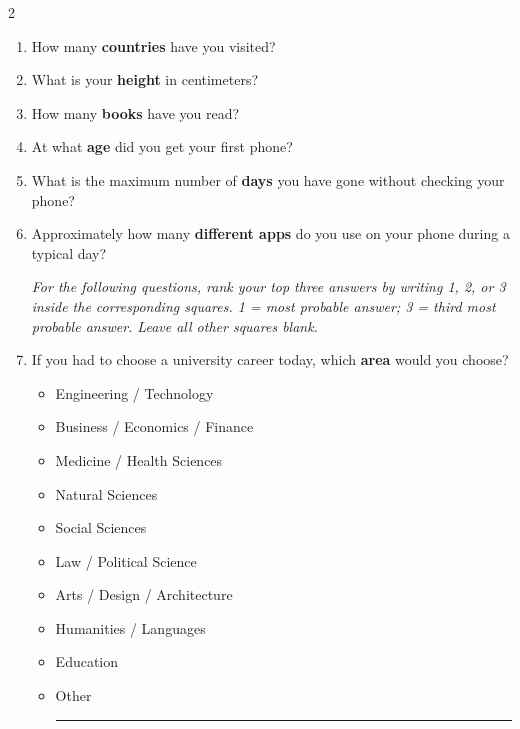 \begin{minipage}{\dimexpr\textwidth+0.5cm\relax}
\begin{multicols}{2}
\begin{enumerate}
				\item How many \textbf{countries} have you visited?
				\hfill \NumberAnswerBox
				
				\item What is your \textbf{height} in centimeters?
				\hfill \NumberAnswerBox
				
				\item How many \textbf{books} have you read?
				\hfill \NumberAnswerBox
				
				\item At what \textbf{age} did you get your first phone?
				\hfill \NumberAnswerBox
				
				\item What is the maximum number of \textbf{days} you have gone without checking your phone?
				\hfill \NumberAnswerBox
				
				\item Approximately how many \textbf{different apps} do you use on your phone during a typical day?
				\hfill \NumberAnswerBox
				
				\begin{center}
					\textit{For the following questions, rank your top three answers by writing 1, 2, or 3 inside the corresponding squares. 1 = most probable answer; 3 = third most probable answer. Leave all other squares blank.}
				\end{center}
				
				\columnbreak
				
				\item If you had to choose a university career today, which \textbf{area} would you choose?
				
				\begin{itemize}[label={\raisebox{-0.1ex}{\huge$\square$}}, leftmargin=2em]
					\item Engineering / Technology
					\item Business / Economics / Finance
					\item Medicine / Health Sciences
					\item Natural Sciences
					\item Social Sciences
					\item Law / Political Science
					\item Arts / Design / Architecture
					\item Humanities / Languages
					\item Education
					\item Other \rule{4cm}{0.4pt}
				\end{itemize}
				

\end{enumerate}
\end{multicols}
\end{minipage}
